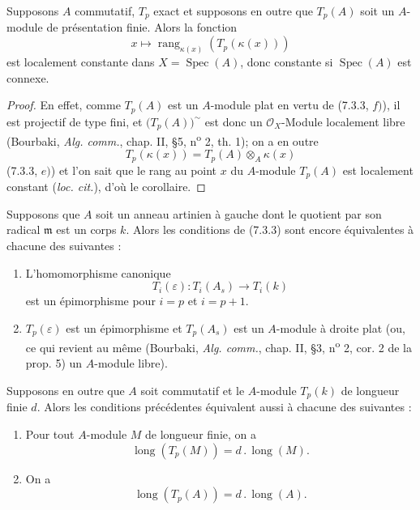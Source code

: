 
\begin{corollary}[7.3.4]
Supposons $A$ commutatif, $T_p$ exact et supposons en outre que $T_p(A)$ soit
un $A$-module de présentation finie. Alors la fonction
\[
  x\mapsto\operatorname{rang}_{\kappa(x)}(T_p(\kappa(x)))
\]
est localement constante dans $X=\operatorname{Spec}(A)$, donc constante si
$\operatorname{Spec}(A)$ est connexe.
\end{corollary}

\begin{proof}
En effet, comme $T_p(A)$ est un $A$-module plat en vertu de (7.3.3, $f)$), il
est projectif de type fini, et $\bigl(T_p(A)\bigr)^{\sim}$ est donc un
$\mathscr O_X$-Module localement libre (Bourbaki, \emph{Alg. comm.}, chap. II,
\S 5, n\textsuperscript{o} 2, th. 1); on a en outre
\[
  T_p(\kappa(x))=T_p(A)\otimes_A\kappa(x)
\]
(7.3.3, $e)$) et l'on sait que le rang au point $x$ du $A$-module $T_p(A)$ est
localement constant (\emph{loc. cit.}), d'où le corollaire.
\end{proof}

\begin{proposition}[7.3.5]
Supposons que $A$ soit un anneau artinien à gauche dont le quotient par son
radical $\mathfrak m$ est un corps $k$. Alors les conditions de (7.3.3) sont
encore équivalentes à chacune des suivantes :
\begin{enumerate}
  \item[g)] L'homomorphisme canonique
    \[
      T_i(\varepsilon):T_i(A_s)\longrightarrow T_i(k)
    \]
    est un épimorphisme pour $i=p$ et $i=p+1$.
  \item[h)] $T_p(\varepsilon)$ est un épimorphisme et $T_p(A_s)$ est un
    $A$-module à droite plat (ou, ce qui revient au même (Bourbaki,
    \emph{Alg. comm.}, chap. II, \S 3, n\textsuperscript{o} 2, cor. 2 de la
    prop. 5) un $A$-module libre).
\end{enumerate}
Supposons en outre que $A$ soit commutatif et le $A$-module $T_p(k)$ de
longueur finie $d$. Alors les conditions précédentes équivalent aussi à
chacune des suivantes :
\begin{enumerate}
  \item[i)] Pour tout $A$-module $M$ de longueur finie, on a
    \[
      \operatorname{long}(T_p(M))=d\mathbin{.}\operatorname{long}(M).
      \tag{7.3.5.1}\label{III.7.3.5.1.fr}
    \]
  \item[j)] On a
    \[
      \operatorname{long}(T_p(A))=d\mathbin{.}\operatorname{long}(A).
      \tag{7.3.5.2}\label{III.7.3.5.2.fr}
    \]
\end{enumerate}
\end{proposition}

